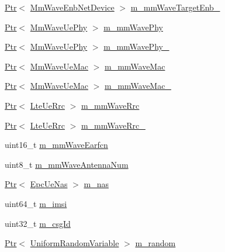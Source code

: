 \begin{DoxyCompactItemize}
\item 
\hyperlink{classns3_1_1Ptr}{Ptr}$<$ \hyperlink{classns3_1_1MmWaveEnbNetDevice}{Mm\+Wave\+Enb\+Net\+Device} $>$ \hyperlink{classns3_1_1McUeNetDevice_a12c0ea5d3ec7931eb7bae191aa198ddd}{m\+\_\+mm\+Wave\+Target\+Enb\+\_}
\item 
\hyperlink{classns3_1_1Ptr}{Ptr}$<$ \hyperlink{classns3_1_1MmWaveUePhy}{Mm\+Wave\+Ue\+Phy} $>$ \hyperlink{classns3_1_1McUeNetDevice_a9158c325114e774e31161794276b1637}{m\+\_\+mm\+Wave\+Phy}
\item 
\hyperlink{classns3_1_1Ptr}{Ptr}$<$ \hyperlink{classns3_1_1MmWaveUePhy}{Mm\+Wave\+Ue\+Phy} $>$ \hyperlink{classns3_1_1McUeNetDevice_a756cd3c4e4bc0a29b7af6e9c21e76e15}{m\+\_\+mm\+Wave\+Phy\+\_}
\item 
\hyperlink{classns3_1_1Ptr}{Ptr}$<$ \hyperlink{classns3_1_1MmWaveUeMac}{Mm\+Wave\+Ue\+Mac} $>$ \hyperlink{classns3_1_1McUeNetDevice_a6044ae25fdaf2ed67afa92e03f2c6449}{m\+\_\+mm\+Wave\+Mac}
\item 
\hyperlink{classns3_1_1Ptr}{Ptr}$<$ \hyperlink{classns3_1_1MmWaveUeMac}{Mm\+Wave\+Ue\+Mac} $>$ \hyperlink{classns3_1_1McUeNetDevice_a78351356a33d01051eac1fe002b8c6b3}{m\+\_\+mm\+Wave\+Mac\+\_}
\item 
\hyperlink{classns3_1_1Ptr}{Ptr}$<$ \hyperlink{classns3_1_1LteUeRrc}{Lte\+Ue\+Rrc} $>$ \hyperlink{classns3_1_1McUeNetDevice_aee9cd8974389dbb0260b3c274cd55f82}{m\+\_\+mm\+Wave\+Rrc}
\item 
\hyperlink{classns3_1_1Ptr}{Ptr}$<$ \hyperlink{classns3_1_1LteUeRrc}{Lte\+Ue\+Rrc} $>$ \hyperlink{classns3_1_1McUeNetDevice_a47adcb400e9cdf80e1618a5e693ee2ee}{m\+\_\+mm\+Wave\+Rrc\+\_}
\item 
uint16\+\_\+t \hyperlink{classns3_1_1McUeNetDevice_a52308e14b27296462483e57cbb7c476f}{m\+\_\+mm\+Wave\+Earfcn}
\item 
uint8\+\_\+t \hyperlink{classns3_1_1McUeNetDevice_a963869c298f5e22d8322ad8c99713068}{m\+\_\+mm\+Wave\+Antenna\+Num}
\item 
\hyperlink{classns3_1_1Ptr}{Ptr}$<$ \hyperlink{classns3_1_1EpcUeNas}{Epc\+Ue\+Nas} $>$ \hyperlink{classns3_1_1McUeNetDevice_ad28cd170780f825a1d8b12beb814a511}{m\+\_\+nas}
\item 
uint64\+\_\+t \hyperlink{classns3_1_1McUeNetDevice_ac441060b78843a6a01ddb10d68b1eee3}{m\+\_\+imsi}
\item 
uint32\+\_\+t \hyperlink{classns3_1_1McUeNetDevice_a5bdf8e15e3ec87d8910204d80fcbd116}{m\+\_\+csg\+Id}
\item 
\hyperlink{classns3_1_1Ptr}{Ptr}$<$ \hyperlink{classns3_1_1UniformRandomVariable}{Uniform\+Random\+Variable} $>$ \hyperlink{classns3_1_1McUeNetDevice_aad7812e41e8bf96bebc98606d8d2157f}{m\+\_\+random}
\end{DoxyCompactItemize}
